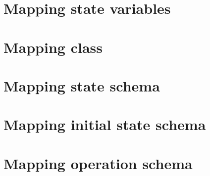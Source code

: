 \section{Mapping state variables}
\label{sec_tra_oz_mapping_state_variables}


\section{Mapping class}
\label{sec_tra_oz_mapping_class}


\section{Mapping state schema}
\label{sec_tra_oz_mapping_state_schema}


\section{Mapping initial state schema}
\label{sec_tra_oz_mapping_initial_state_schema}


\section{Mapping operation schema}
\label{sec_tra_oz_mapping_operation_schema}

